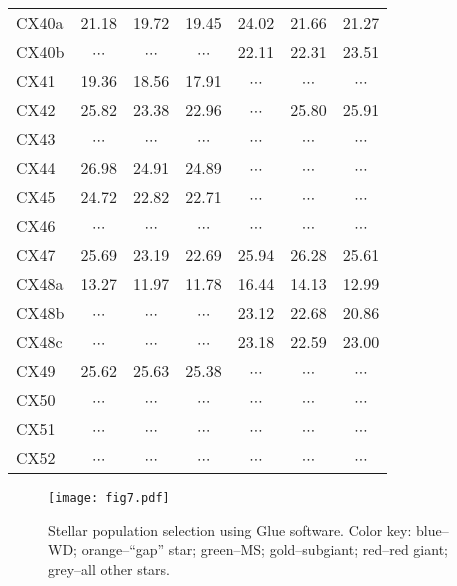 \documentclass[fleqn,usenatbib]{mnras}
\newcommand\nodata{ ~$\cdots$~ }%
\newcommand{\nd}{\nodata}
\begin{document}
\begin{table}
\begin{tabular}{lcccccc}
CX40a  &  21.18  &  19.72  &  19.45  &  24.02  &  21.66  &  21.27  \\
CX40b  &  \nd    &  \nd    &  \nd    &  22.11  &  22.31  &  23.51  \\
CX41   &  19.36  &  18.56  &  17.91  &  \nd    &  \nd    &  \nd    \\
CX42   &  25.82  &  23.38  &  22.96  &  \nd    &  25.80  &  25.91  \\
CX43   &  \nd    &  \nd    &  \nd    &  \nd    &  \nd    &  \nd    \\
CX44   &  26.98  &  24.91  &  24.89  &  \nd    &  \nd    &  \nd    \\
CX45   &  24.72  &  22.82  &  22.71  &  \nd    &  \nd    &  \nd    \\
CX46   &  \nd    &  \nd    &  \nd    &  \nd    &  \nd    &  \nd    \\
CX47   &  25.69  &  23.19  &  22.69  &  25.94  &  26.28  &  25.61  \\
CX48a  &  13.27  &  11.97  &  11.78  &  16.44  &  14.13  &  12.99  \\
CX48b  &  \nd    &  \nd    &  \nd    &  23.12  &  22.68  &  20.86  \\
CX48c  &  \nd    &  \nd    &  \nd    &  23.18  &  22.59  &  23.00  \\
CX49   &  25.62  &  25.63  &  25.38  &  \nd    &  \nd    &  \nd    \\
CX50   &  \nd    &  \nd    &  \nd    &  \nd    &  \nd    &  \nd    \\
CX51   &  \nd    &  \nd    &  \nd    &  \nd    &  \nd    &  \nd    \\
CX52   &  \nd    &  \nd    &  \nd    &  \nd    &  \nd    &  \nd    \\
\hline
\end{tabular}
\end{table}

\begin{figure}
\texttt{[image: fig7.pdf]}
\caption{Stellar population selection using Glue software. Color key: blue--WD; orange--``gap'' star; green--MS; gold--subgiant; red--red giant; grey--all other stars.}
\label{f:population_selection}
\end{figure}
\end{document}
